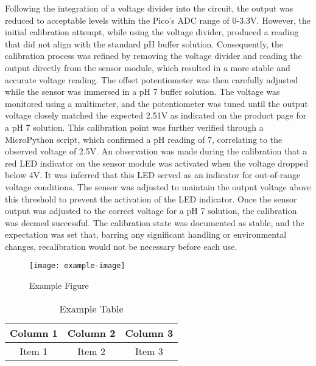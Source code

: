 \documentclass[12pt]{article}
\begin{document}
Following the integration of a voltage divider into the circuit, the output was reduced to acceptable levels within the Pico's ADC range of 0-3.3V. However, the initial calibration attempt, while using the voltage divider, produced a reading that did not align with the standard pH buffer solution. Consequently, the calibration process was refined by removing the voltage divider and reading the output directly from the sensor module, which resulted in a more stable and accurate voltage reading.
\newline
\newline
\noindent The offset potentiometer was then carefully adjusted while the sensor was immersed in a pH 7 buffer solution. The voltage was monitored using a multimeter, and the potentiometer was tuned until the output voltage closely matched the expected 2.51V as indicated on the product page for a pH 7 solution. This calibration point was further verified through a MicroPython script, which confirmed a pH reading of 7, correlating to the observed voltage of 2.5V.
\newline
\newline
\noindent An observation was made during the calibration that a red LED indicator on the sensor module was activated when the voltage dropped below 4V. It was inferred that this LED served as an indicator for out-of-range voltage conditions. The sensor was adjusted to maintain the output voltage above this threshold to prevent the activation of the LED indicator.
Once the sensor output was adjusted to the correct voltage for a pH 7 solution, the calibration was deemed successful. The calibration state was documented as stable, and the expectation was set that, barring any significant handling or environmental changes, recalibration would not be necessary before each use. 
\newline
\newline



\begin{figure}[H]
    \centering
    \texttt{[image: example-image]}
    \caption{Example Figure}
    \label{fig:example}
\end{figure}

\begin{table}[H]
    \centering
    \begin{tabular}{|c|c|c|}
        \hline
        Column 1 & Column 2 & Column 3 \\
        \hline
        Item 1 & Item 2 & Item 3 \\
        \hline
    \end{tabular}
    \caption{Example Table}
    \label{tab:example}
\end{table}
\end{document}
